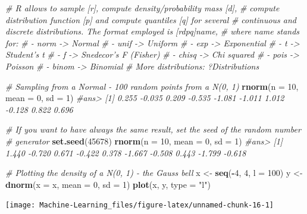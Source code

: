 \documentclass[]{book}
\newenvironment{Shaded}{\begin{snugshade}}{\end{snugshade}}
\newcommand{\KeywordTok}[1]{\textcolor[rgb]{0.13,0.29,0.53}{\textbf{#1}}}
\newcommand{\DataTypeTok}[1]{\textcolor[rgb]{0.13,0.29,0.53}{#1}}
\newcommand{\DecValTok}[1]{\textcolor[rgb]{0.00,0.00,0.81}{#1}}
\newcommand{\StringTok}[1]{\textcolor[rgb]{0.31,0.60,0.02}{#1}}
\newcommand{\CommentTok}[1]{\textcolor[rgb]{0.56,0.35,0.01}{\textit{#1}}}
\newcommand{\OperatorTok}[1]{\textcolor[rgb]{0.81,0.36,0.00}{\textbf{#1}}}
\newcommand{\NormalTok}[1]{#1}
\theoremstyle{definition}
\theoremstyle{definition}
\theoremstyle{definition}
\theoremstyle{remark}
\begin{document}
\begin{Shaded}
\begin{Highlighting}[]
\CommentTok{# R allows to sample [r], compute density/probability mass [d],}
\CommentTok{# compute distribution function [p] and compute quantiles [q] for several}
\CommentTok{# continuous and discrete distributions. The format employed is [rdpq]name,}
\CommentTok{# where name stands for:}
\CommentTok{# - norm -> Normal}
\CommentTok{# - unif -> Uniform}
\CommentTok{# - exp -> Exponential}
\CommentTok{# - t -> Student's t}
\CommentTok{# - f -> Snedecor's F (Fisher)}
\CommentTok{# - chisq -> Chi squared}
\CommentTok{# - pois -> Poisson}
\CommentTok{# - binom -> Binomial}
\CommentTok{# More distributions: ?Distributions}


\CommentTok{# Sampling from a Normal - 100 random points from a N(0, 1)}
\KeywordTok{rnorm}\NormalTok{(}\DataTypeTok{n =} \DecValTok{10}\NormalTok{, }\DataTypeTok{mean =} \DecValTok{0}\NormalTok{, }\DataTypeTok{sd =} \DecValTok{1}\NormalTok{)}
\CommentTok{#ans>  [1]  0.255 -0.035  0.209 -0.535 -1.081 -1.011  1.012 -0.128  0.822  0.696}

\CommentTok{# If you want to have always the same result, set the seed of the random number}
\CommentTok{# generator}
\KeywordTok{set.seed}\NormalTok{(}\DecValTok{45678}\NormalTok{)}
\KeywordTok{rnorm}\NormalTok{(}\DataTypeTok{n =} \DecValTok{10}\NormalTok{, }\DataTypeTok{mean =} \DecValTok{0}\NormalTok{, }\DataTypeTok{sd =} \DecValTok{1}\NormalTok{)}
\CommentTok{#ans>  [1]  1.440 -0.720  0.671 -0.422  0.378 -1.667 -0.508  0.443 -1.799 -0.618}

\CommentTok{# Plotting the density of a N(0, 1) - the Gauss bell}
\NormalTok{x <-}\StringTok{ }\KeywordTok{seq}\NormalTok{(}\OperatorTok{-}\DecValTok{4}\NormalTok{, }\DecValTok{4}\NormalTok{, }\DataTypeTok{l =} \DecValTok{100}\NormalTok{)}
\NormalTok{y <-}\StringTok{ }\KeywordTok{dnorm}\NormalTok{(}\DataTypeTok{x =}\NormalTok{ x, }\DataTypeTok{mean =} \DecValTok{0}\NormalTok{, }\DataTypeTok{sd =} \DecValTok{1}\NormalTok{)}
\KeywordTok{plot}\NormalTok{(x, y, }\DataTypeTok{type =} \StringTok{"l"}\NormalTok{)}
\end{Highlighting}
\end{Shaded}

\begin{center}\texttt{[image: Machine-Learning\_files/figure-latex/unnamed-chunk-16-1]} \end{center}
\end{document}
